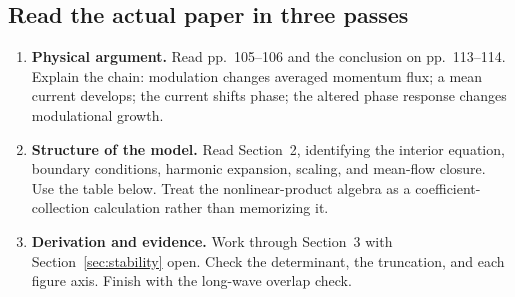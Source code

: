 \subsection{Read the actual paper in three passes}
\begin{enumerate}
\item \textbf{Physical argument.} Read pp.~105--106 and the conclusion on
pp.~113--114. Explain the chain: modulation changes averaged momentum
flux; a mean current develops; the current shifts phase; the altered
phase response changes modulational growth.
\item \textbf{Structure of the model.} Read Section~2, identifying the
interior equation, boundary conditions, harmonic expansion, scaling, and
mean-flow closure. Use the table below. Treat the nonlinear-product
algebra as a coefficient-collection calculation rather than memorizing it.
\item \textbf{Derivation and evidence.} Work through Section~3 with
Section~\ref{sec:stability} open. Check the determinant, the truncation,
and each figure axis. Finish with the long-wave overlap check.
\end{enumerate}

